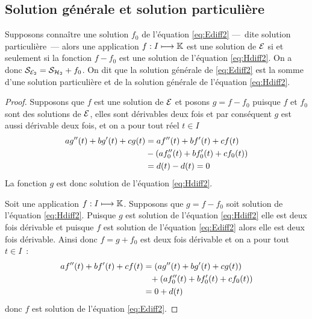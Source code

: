 \subsection{Solution générale et solution particulière}
\label{subsec:solutiongeneraleetsolutionpart}
\begin{theo}
    Supposons connaître une solution \(f_0\) de l'équation \eqref{eq:Ediff2} ---~dite solution particulière~--- alors une application \(f:I \longmapsto \mathbb{K}\) est une solution de \(\mathcal{E}\) si et seulement si la fonction \(f-f_0\) est une solution de l'équation \eqref{eq:Hdiff2}. On a donc \(\mathcal{S}_{\mathcal{E}_2}=\mathcal{S}_{\mathcal{H}_2} + f_0\). On dit que la solution générale de \eqref{eq:Ediff2} est la somme d'une solution particulière et de la solution générale de l'équation \eqref{eq:Hdiff2}.
\end{theo}
\begin{proof}
  Supposons que \(f\) est une solution de \(\mathcal{E}\) et posons \(g=f-f_0\) puisque \(f\) et \(f_0\) sont des solutions de \(\mathcal{E}\), elles sont dérivables deux fois et par conséquent \(g\) est aussi dérivable deux fois, et on a pour tout réel \(t \in I\)
  \begin{align}
    ag''(t)+bg'(t)+cg(t) &= af''(t)+bf'(t)+cf(t) \notag\\ &- (af_0''(t)+bf_0'(t)+cf_0(t))\\ &= d(t)-d(t)=0
  \end{align}
La fonction \(g\) est donc solution de l'équation \eqref{eq:Hdiff2}.

Soit une application \(f:I \longmapsto \mathbb{K}\). Supposons que \(g=f-f_0\) soit solution de l'équation \eqref{eq:Hdiff2}. Puisque \(g\) est solution de l'équation \eqref{eq:Hdiff2} elle est deux fois dérivable et puisque \(f\) est solution de l'équation \eqref{eq:Ediff2} alors elle est deux fois dérivable. Ainsi donc \(f=g+f_0\) est deux fois dérivable et on a pour tout \(t \in I\)~:
\begin{align}
  af''(t)+bf'(t)+cf(t)&=(ag''(t)+bg'(t)+cg(t))\notag\\ &\phantom{=}+(af_0''(t)+bf_0'(t)+cf_0(t))\\ &=0+d(t) 
\end{align}
donc \(f\) est solution de l'équation \eqref{eq:Ediff2}.
\end{proof}
